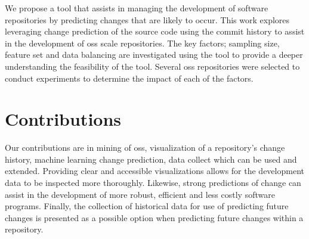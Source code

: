 

We propose a tool that assists in managing the development of software repositories by predicting changes that are likely to occur. This work explores leveraging change prediction of the source code using the commit history to assist in the development of \gls{oss} scale repositories. The key factors; sampling size, feature set and data balancing are investigated using the tool to provide a deeper understanding the feasibility of the tool. Several \gls{oss} repositories were selected to conduct experiments to determine the impact of each of the factors.

\section{Contributions}

Our contributions are in mining of \gls{oss}, visualization of a repository's change history, machine learning change prediction, data collect which can be used and extended. Providing clear and accessible visualizations allows for the development data to be inspected more thoroughly. Likewise, strong predictions of change can assist in the development of more robust, efficient and less costly software programs. Finally, the collection of historical data for use of predicting future changes is presented as a possible option when predicting future changes within a repository.

